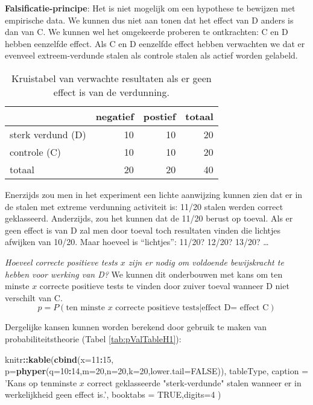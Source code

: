 \documentclass[12pt,dutch,coursenotes]{book}
\newenvironment{Shaded}{\begin{snugshade}}{\end{snugshade}}
\newcommand{\KeywordTok}[1]{\textcolor[rgb]{0.13,0.29,0.53}{\textbf{#1}}}
\newcommand{\DataTypeTok}[1]{\textcolor[rgb]{0.13,0.29,0.53}{#1}}
\newcommand{\DecValTok}[1]{\textcolor[rgb]{0.00,0.00,0.81}{#1}}
\newcommand{\StringTok}[1]{\textcolor[rgb]{0.31,0.60,0.02}{#1}}
\newcommand{\OtherTok}[1]{\textcolor[rgb]{0.56,0.35,0.01}{#1}}
\newcommand{\OperatorTok}[1]{\textcolor[rgb]{0.81,0.36,0.00}{\textbf{#1}}}
\newcommand{\NormalTok}[1]{#1}
\theoremstyle{definition}
\theoremstyle{definition}
\theoremstyle{definition}
\theoremstyle{remark}
\begin{document}
\textbf{Falsificatie-principe}: Het is niet mogelijk om een hypothese te
bewijzen met empirische data. We kunnen dus niet aan tonen dat het
effect van D anders is dan van C. We kunnen wel het omgekeerde proberen
te ontkrachten: C en D hebben eenzelfde effect. Als C en D eenzelfde
effect hebben verwachten we dat er evenveel extreem-verdunde stalen als
controle stalen als actief worden gelabeld.

\begin{table}[t]

\caption{\label{tab:kruistabelTheo}Kruistabel van verwachte resultaten als er geen effect is van de verdunning.}
\centering
\begin{tabular}{lrrr}
\toprule
  & negatief & postief & totaal\\
\midrule
sterk verdund (D) & 10 & 10 & 20\\
controle (C) & 10 & 10 & 20\\
totaal & 20 & 20 & 40\\
\bottomrule
\end{tabular}
\end{table}

Enerzijds zou men in het experiment een lichte aanwijzing kunnen zien
dat er in de stalen met extreme verdunning activiteit is: 11/20 stalen
werden correct geklasseerd. Anderzijds, zou het kunnen dat de 11/20
berust op toeval. Als er geen effect is van D zal men door toeval toch
resultaten vinden die lichtjes afwijken van 10/20. Maar hoeveel is
``lichtjes'': 11/20? 12/20? 13/20? \ldots{}

\emph{Hoeveel correcte positieve tests \(x\) zijn er nodig om voldoende
bewijskracht te hebben voor werking van D?} We kunnen dit onderbouwen
met kans om ten minste \(x\) correcte positieve tests te vinden door
zuiver toeval wanneer D niet verschilt van C.
\[p=P(\text{ten minste } x \text{ correcte positieve tests} \vert \text{effect D= effect C})\]

Dergelijke kansen kunnen worden berekend door gebruik te maken van
probabiliteitstheorie (Tabel \ref{tab:pValTableH1}):

\begin{Shaded}
\begin{Highlighting}[]
\NormalTok{knitr}\OperatorTok{::}\KeywordTok{kable}\NormalTok{(}\KeywordTok{cbind}\NormalTok{(}\DataTypeTok{x=}\DecValTok{11}\OperatorTok{:}\DecValTok{15}\NormalTok{,}
  \DataTypeTok{p=}\KeywordTok{phyper}\NormalTok{(}\DataTypeTok{q=}\DecValTok{10}\OperatorTok{:}\DecValTok{14}\NormalTok{,}\DataTypeTok{m=}\DecValTok{20}\NormalTok{,}\DataTypeTok{n=}\DecValTok{20}\NormalTok{,}\DataTypeTok{k=}\DecValTok{20}\NormalTok{,}\DataTypeTok{lower.tail=}\OtherTok{FALSE}\NormalTok{)), tableType,}
  \DataTypeTok{caption =} \StringTok{'Kans op tenminste $x$ correct geklasseerde "sterk-verdunde" stalen wanneer er in werkelijkheid geen effect is.'}\NormalTok{,}
  \DataTypeTok{booktabs =} \OtherTok{TRUE}\NormalTok{,}\DataTypeTok{digits=}\DecValTok{4}
\NormalTok{)}
\end{Highlighting}
\end{Shaded}
\end{document}
